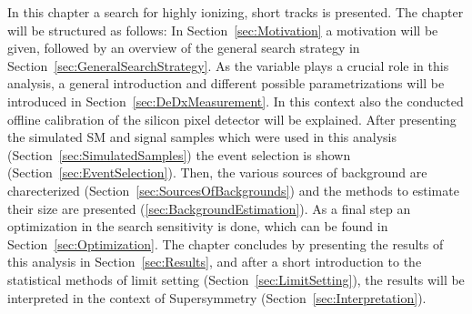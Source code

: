 In this chapter a search for highly ionizing, short tracks is presented. The chapter will be structured as follows:
In \mbox{Section~\ref{sec:Motivation}} a motivation will be given, followed by an overview of the general search strategy in \mbox{Section~\ref{sec:GeneralSearchStrategy}}.
As the variable \dedx plays a crucial role in this analysis, a general introduction and different possible parametrizations will be introduced in \mbox{Section~\ref{sec:DeDxMeasurement}}.
In this context also the conducted offline calibration of the silicon pixel detector will be explained.
After presenting the simulated SM and signal samples which were used in this analysis (\mbox{Section~\ref{sec:SimulatedSamples}}) the event selection is shown (Section~\ref{sec:EventSelection}).
Then, the various sources of background are charecterized (Section~\ref{sec:SourcesOfBackgrounds}) and the methods to estimate their size are presented (\ref{sec:BackgroundEstimation}).
As a final step an optimization in the search sensitivity is done, which can be found in Section~\ref{sec:Optimization}.
The chapter concludes by presenting the results of this analysis in Section~\ref{sec:Results}, and after a short introduction to the statistical methods of limit setting (Section~\ref{sec:LimitSetting}), the results will be interpreted in the context of Supersymmetry (Section~\ref{sec:Interpretation}).



